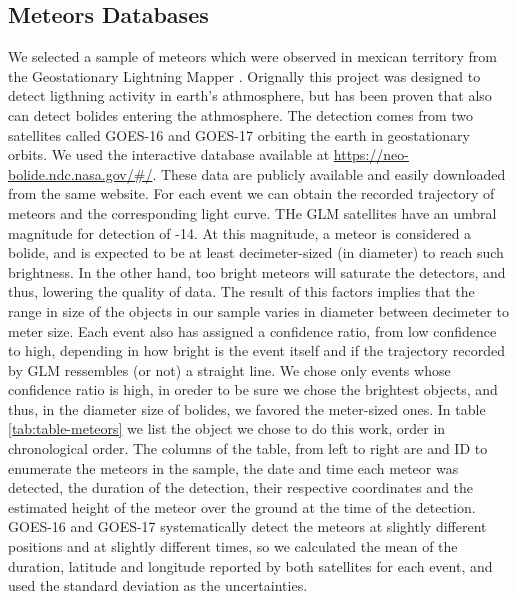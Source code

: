 \subsection{Meteors Databases}
\label{ssec:databases}
We selected a sample of meteors which were observed in mexican territory from the Geostationary Lightning Mapper \citep{GOODMAN:2013}. Orignally this project was designed to detect ligthning activity in earth's athmosphere, but has been proven that also can detect bolides entering the athmosphere. The detection comes from two satellites called GOES-16 and GOES-17 orbiting the earth in geostationary orbits. %
We used the interactive database available at \url{https://neo-bolide.ndc.nasa.gov/#/}. These data are publicly available and easily downloaded from the same website. For each event we can obtain the recorded trajectory of meteors and the corresponding light curve. THe GLM satellites have an umbral magnitude for detection of -14. At this magnitude, a meteor is considered a bolide, and is expected to be at least decimeter-sized (in diameter) to reach such brightness. In the other hand, too bright meteors will saturate the detectors, and thus, lowering the quality of data. The result of this factors implies that the range in size of the objects in our sample varies in diameter between decimeter to meter size. %
Each event also has assigned a confidence ratio, from low confidence to high, depending in how bright is the event itself and if the trajectory recorded by GLM ressembles (or not) a straight line. We chose only events whose confidence ratio is high, in oreder to be sure we chose the brightest objects, and thus, in the diameter size of bolides, we favored the meter-sized ones. In table \ref{tab:table-meteors} we list the object we chose to do this work, order in chronological order. The columns of the table, from left to right are and ID to enumerate the meteors in the sample, the date and time each meteor was detected, the duration of the detection, their respective coordinates and the estimated height of the meteor over the ground at the time of the detection. GOES-16 and GOES-17 systematically detect the meteors at slightly different positions and at slightly different times, so we calculated the mean of the duration, latitude and longitude reported by both satellites for each event, and used the standard deviation as the uncertainties.

